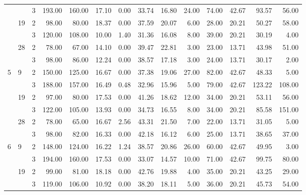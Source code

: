 \begin{tabular}{lllrrrrrrrrrrr}
  &    & 3 &   193.00 &    160.00 & 17.10 &    0.00 &   33.74 &   16.80 &   24.00 &   74.00 &   42.67 &  93.57 &    56.00 \\
\cline{2-14}
  & \multirow{2}{*}{19} & 2 &    98.00 &     80.00 & 18.37 &    0.00 &   37.59 &   20.07 &    6.00 &   28.00 &   20.21 &  50.27 &    58.00 \\
  &    & 3 &   120.00 &    108.00 & 10.00 &    1.40 &   31.36 &   16.08 &    8.00 &   39.00 &   20.21 &  30.19 &     4.00 \\
\cline{2-14}
  & \multirow{2}{*}{28} & 2 &    78.00 &     67.00 & 14.10 &    0.00 &   39.47 &   22.81 &    3.00 &   23.00 &   13.71 &  43.98 &    51.00 \\
  &    & 3 &    98.00 &     86.00 & 12.24 &    0.00 &   38.57 &   17.18 &    3.00 &   24.00 &   13.71 &  30.17 &     2.00 \\
\cline{1-14}
\cline{2-14}
\multirow{6}{*}{5} & \multirow{2}{*}{9} & 2 &   150.00 &    125.00 & 16.67 &    0.00 &   37.38 &   19.06 &   27.00 &   82.00 &   42.67 &  48.33 &     5.00 \\
  &    & 3 &   188.00 &    157.00 & 16.49 &    0.48 &   32.96 &   15.96 &    5.00 &   79.00 &   42.67 & 123.22 &   108.00 \\
\cline{2-14}
  & \multirow{2}{*}{19} & 2 &    97.00 &     80.00 & 17.53 &    0.00 &   41.26 &   18.62 &   12.00 &   34.00 &   20.21 &  53.11 &    56.00 \\
  &    & 3 &   122.00 &    105.00 & 13.93 &    0.00 &   34.73 &   16.55 &    8.00 &   34.00 &   20.21 &  85.58 &   151.00 \\
\cline{2-14}
  & \multirow{2}{*}{28} & 2 &    78.00 &     65.00 & 16.67 &    2.56 &   43.31 &   21.50 &    7.00 &   22.00 &   13.71 &  31.05 &     5.00 \\
  &    & 3 &    98.00 &     82.00 & 16.33 &    0.00 &   42.18 &   16.12 &    6.00 &   25.00 &   13.71 &  38.65 &    37.00 \\
\cline{1-14}
\cline{2-14}
\multirow{6}{*}{6} & \multirow{2}{*}{9} & 2 &   148.00 &    124.00 & 16.22 &    1.24 &   38.57 &   20.86 &   26.00 &   60.00 &   42.67 &  49.95 &     3.00 \\
  &    & 3 &   194.00 &    160.00 & 17.53 &    0.00 &   33.07 &   14.57 &   10.00 &   71.00 &   42.67 &  99.75 &    80.00 \\
\cline{2-14}
  & \multirow{2}{*}{19} & 2 &    99.00 &     81.00 & 18.18 &    0.00 &   42.76 &   19.88 &    4.00 &   35.00 &   20.21 &  43.25 &    29.00 \\
  &    & 3 &   119.00 &    106.00 & 10.92 &    0.00 &   38.20 &   18.11 &    5.00 &   36.00 &   20.21 &  45.73 &    54.00 \\

\end{tabular}
